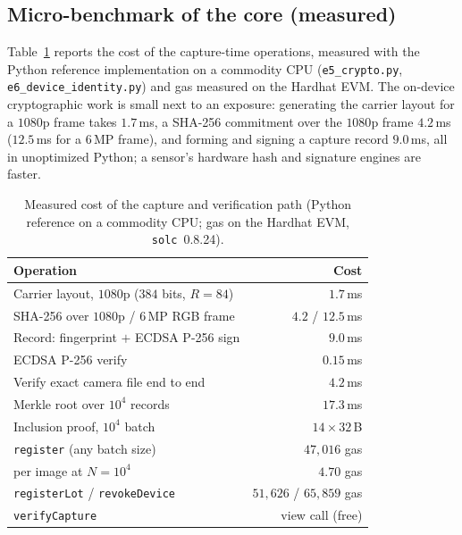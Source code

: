 \documentclass[journal]{IEEEtran}
\begin{document}
\ifshort
\else
\subsection{Micro-benchmark of the core (measured)}
Table~\ref{tab:micro} reports the cost of the capture-time operations, measured
with the Python reference implementation on a commodity CPU (\texttt{e5\_crypto.py},
\texttt{e6\_device\_identity.py}) and gas measured on the Hardhat EVM. The
on-device cryptographic work is small next to an exposure: generating the carrier
layout for a $1080$p frame takes $1.7$\,ms, a \mbox{SHA-256} commitment over the
$1080$p frame $4.2$\,ms ($12.5$\,ms for a $6$\,MP frame), and forming and signing a
capture record $9.0$\,ms, all in unoptimized Python; a sensor's hardware hash and
signature engines are faster.

\begin{table}[t]
\centering
\caption{Measured cost of the capture and verification path (Python reference on
a commodity CPU; gas on the Hardhat EVM, \texttt{solc}~0.8.24).}
\label{tab:micro}
\renewcommand{\arraystretch}{1.15}
\footnotesize
\begin{tabular}{@{}lr@{}}
\toprule
\textbf{Operation} & \textbf{Cost} \\
\midrule
Carrier layout, $1080$p ($384$ bits, $R\!=\!84$) & $1.7$\,ms \\
SHA-256 over $1080$p / $6$\,MP RGB frame  & $4.2$ / $12.5$\,ms \\
Record: fingerprint $+$ ECDSA P-256 sign  & $9.0$\,ms \\
ECDSA P-256 verify                         & $0.15$\,ms \\
Verify exact camera file end to end        & $4.2$\,ms \\
Merkle root over $10^4$ records            & $17.3$\,ms \\
Inclusion proof, $10^4$ batch              & $14\times32$\,B \\
\midrule
\texttt{register} (any batch size)         & $47{,}016$ gas \\
\quad per image at $N\!=\!10^4$            & $4.70$ gas \\
\texttt{registerLot} / \texttt{revokeDevice} & $51{,}626$ / $65{,}859$ gas \\
\texttt{verifyCapture}                     & view call (free) \\
\bottomrule
\end{tabular}
\end{table}
\end{document}
